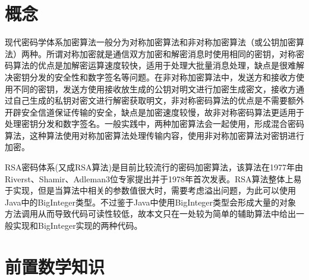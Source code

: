 \documentclass[UTF8,a4paper,11pt]{ctexart}
\begin{document}
\section{概念}
    \par 现代密码学体系加密算法一般分为对称加密算法和非对称加密算法（或公钥加密算法）两种。所谓对称加密就是通信双方加密和解密消息时使用相同的密钥，对称密码算法的优点是加解密运算速度较快，适用于处理大批量消息处理，缺点是很难解决密钥分发的安全性和数字签名等问题。在非对称加密算法中，发送方和接收方使用不同的密钥，发送方使用接收放生成的公钥对明文进行加密生成密文，接收方通过自己生成的私钥对密文进行解密获取明文，非对称密码算法的优点是不需要额外开辟安全信道保证传输的安全，缺点是加密速度较慢，故非对称密码算法更适用于处理密钥分发和数字签名。一般实践中，两种加密算法会一起使用，形成混合密码算法，这种算法使用对称加密算法处理传输内容，使用非对称加密算法对密钥进行加密。
	\par RSA密码体系(又成RSA算法)是目前比较流行的密码加密算法，该算法在1977年由Riverst、Shamir、Adleman3位专家提出并于1978年首次发表。RSA算法整体上易于实现，但是当算法中相关的参数值很大时，需要考虑溢出问题，为此可以使用Java中的BigInteger类型。不过鉴于Java中使用BigInteger类型会形成大量的对象方法调用从而导致代码可读性较低，故本文只在一处较为简单的辅助算法中给出一般实现和BigInteger实现的两种代码。
 
\section{前置数学知识}
\end{document}

